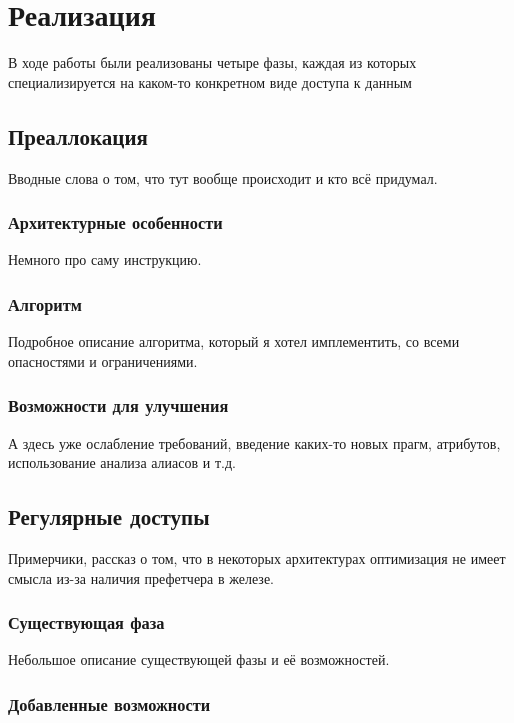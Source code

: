 \documentclass[12pt,a4paper]{article}
\begin{document}
\section{Реализация}

В ходе работы были реализованы четыре фазы, каждая из которых специализируется на каком-то конкретном виде доступа к данным

\subsection{Преаллокация}

Вводные слова о том, что тут вообще происходит и кто всё придумал.

\subsubsection{Архитектурные особенности}

Немного про саму инструкцию.

\subsubsection{Алгоритм}

Подробное описание алгоритма, который я хотел имплементить, со всеми опасностями и ограничениями.

\subsubsection{Возможности для улучшения}

А здесь уже ослабление требований, введение каких-то новых прагм, атрибутов, использование анализа алиасов и т.д.

\subsection{Регулярные доступы}

Примерчики, рассказ о том, что в некоторых архитектурах оптимизация не имеет смысла из-за наличия префетчера в железе.

\subsubsection{Существующая фаза}

Небольшое описание существующей фазы и её возможностей.

\subsubsection{Добавленные возможности}
\end{document}
